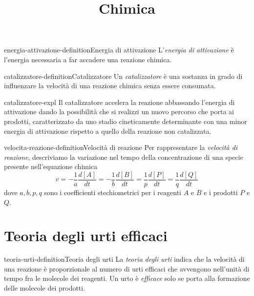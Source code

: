 \documentclass[preview]{standalone}
\begin{document}
\title{Chimica}
\genpage

\begin{snippetdefinition}{energia-attivazione-definition}{Energia di attivazione}
    L'\textit{energia di attivazione} è l'energia necessaria
    a far accadere una reazione chimica.
\end{snippetdefinition}

\begin{snippetdefinition}{catalizzatore-definition}{Catalizzatore}
    Un \textit{catalizzatore} è
    una sostanza in grado di influenzare la
    velocità di una reazione chimica senza essere consumata.
\end{snippetdefinition}

\begin{snippet}{catalizzatore-expl}
    Il catalizzatore accelera la reazione abbassando l'energia
di attivazione dando la possibilità che si realizzi un nuovo
percorso che porta ai prodotti, caratterizzato da uno stadio
cineticamente determinante con una minor energia di
attivazione rispetto a quello della reazione non catalizzata.
\end{snippet}

\begin{snippetdefinition}{velocita-reazione-definition}{Velocità di reazione}
    Per rappresentare la \textit{velocità di reazione}, descriviamo la
    variazione nel tempo della concentrazione di una specie
    presente nell'equazione chimica
    \[
        v
        = - \frac{1}{a} \frac{d[A]}{dt}
        = - \frac{1}{b} \frac{d[B]}{dt}
        = \frac{1}{p} \frac{d[P]}{dt}
        = \frac{1}{q} \frac{d[Q]}{dt}
    \]
    dove \(a,b,p,q\) sono i coefficienti stechiometrici
    per i reagenti \(A\) e \(B\) e i prodotti \(P\) e \(Q\).
\end{snippetdefinition}

\section{Teoria degli urti efficaci}

\begin{snippetdefinition}{teoria-urti-definition}{Teoria degli urti}
    La \textit{teoria degli urti}
    indica che 
    la velocità di una reazione è
    proporzionale al numero di urti efficaci che avvengono
    nell'unità di tempo fra le molecole dei reagenti.
    Un urto è \textit{efficace} solo se porta alla formazione delle
    molecole dei prodotti.
\end{snippetdefinition}
\end{document}
